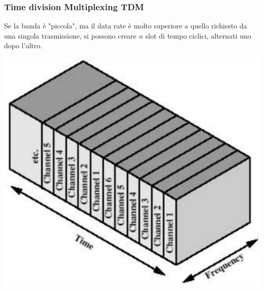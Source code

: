 \subsubsection{Time division Multiplexing TDM}
Se la banda è "piccola", ma il data rate è molto superiore a quello richiesto da una singola trasmissione, si possono creare $n$ slot di tempo ciclici, alternati uno dopo l'altro.
\begin{center}
	\includegraphics[width=0.4\linewidth]{img/PTT/tdm1}
\end{center}